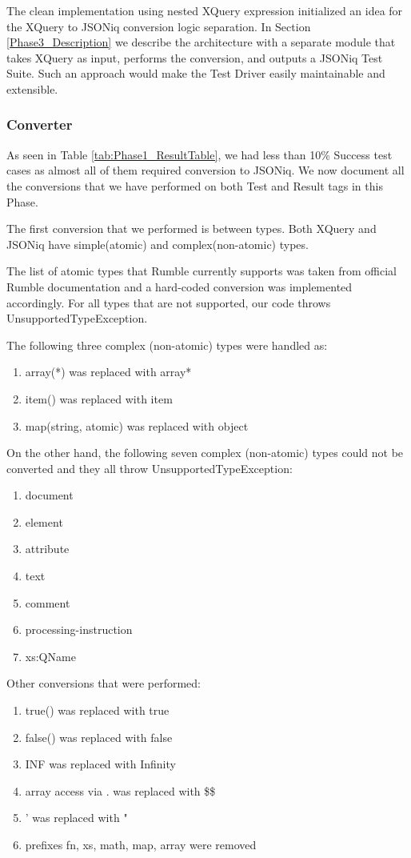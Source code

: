 The clean implementation using nested XQuery expression initialized an idea for the XQuery to JSONiq conversion logic separation. In Section \ref{Phase3_Description} we describe the architecture with a separate module that takes XQuery as input, performs the conversion, and outputs a JSONiq Test Suite. Such an approach would make the Test Driver easily maintainable and extensible.

\subsubsection{Converter}
\label{Phase2_Converter}
As seen in Table \ref{tab:Phase1_ResultTable}, we had less than 10\% Success test cases as almost all of them required conversion to JSONiq. We now document all the conversions that we have performed on both Test and Result tags in this Phase. 

The first conversion that we performed is between types. Both XQuery and JSONiq have simple(atomic) and complex(non-atomic) types. 

The list of atomic types that Rumble currently supports was taken from official Rumble documentation \cite{RumbleSupportedTypes} and a hard-coded conversion was implemented accordingly. For all types that are not supported, our code throws UnsupportedTypeException. 

The following three complex (non-atomic) types were handled as:
\begin{enumerate}
	\item array(*) was replaced with array*
	\item item() was replaced with item
	\item map(string, atomic) was replaced with object 
\end{enumerate}

On the other hand, the following seven complex (non-atomic) types could not be converted and they all throw UnsupportedTypeException:
\begin{enumerate}
	\item document
	\item element
	\item attribute
	\item text
	\item comment
	\item processing-instruction
	\item xs:QName
\end{enumerate}

Other conversions that were performed:
\begin{enumerate}
	\item true() was replaced with true
	\item false() was replaced with false
	\item INF was replaced with Infinity
	\item array access via . was replaced with \$\$
	\item ' was replaced with "
	\item prefixes fn, xs, math, map, array were removed
\end{enumerate}

